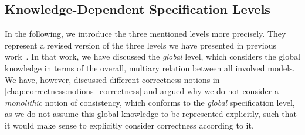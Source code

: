 

\subsection{Knowledge-Dependent Specification Levels}

In the following, we introduce the three mentioned levels more precisely.
They represent a revised version of the three levels we have presented in previous work~.
In that work, we have discussed the \emph{global} level, which considers the global knowledge in terms of the overall, multiary relation between all involved models.
We have, however, discussed different correctness notions in \autoref{chap:correctness:notions_correctness} and argued why we do not consider a \emph{monolithic} notion of consistency, which conforms to the \emph{global} specification level, as we do not assume this global knowledge to be represented explicitly, such that it would make sense to explicitly consider correctness according to it.

%    

